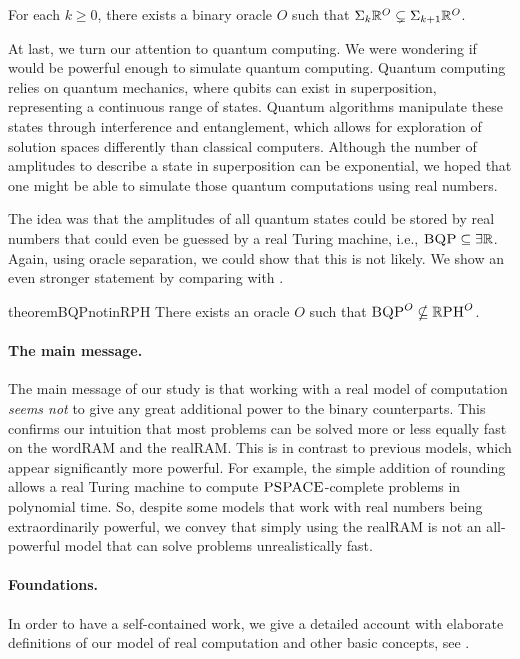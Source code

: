 \documentclass{article}
\begin{document}
    \begin{corollary}
        For each $k\geq 0$, there exists a binary oracle $O$ such that $\Sigma_{k}\mathbb{R}^O \subsetneq \Sigma_{k+1}\mathbb{R}^O$.
    \end{corollary}

    At last, we turn our attention to quantum computing.
    We were wondering if \ER would be powerful enough to simulate quantum computing.
    Quantum computing relies on quantum mechanics, where qubits can exist in superposition, representing a continuous range of states. 
    Quantum algorithms manipulate these states through interference and entanglement, which allows for exploration of solution spaces differently than classical computers. 
    Although the number of amplitudes to describe a state in superposition can be exponential,  we hoped that one might be able to simulate those 
    quantum computations using real numbers. 
    
    The idea was that the amplitudes of all quantum states could be stored by real numbers that could even be guessed by a real Turing machine, i.e., $\textsc{BQP} \subseteq \exists\mathbb{R}$.
    Again, using oracle separation, we could show that this is not likely.
    We show an even stronger statement by comparing \BQP with \RPH.

    \begin{restatable}{theorem}{BQPnotinRPH}
    \label{thm:BQPnotinRPH}
        There exists an oracle $O$ such that $\textsc{BQP}^O \nsubseteq \mathbb{R}\textsc{PH}^O$.
    \end{restatable}

    \paragraph{The main message.}
    The main message of our study is that working with a real model of computation \textit{seems not} to give any great additional power to the binary counterparts.
    This confirms our intuition that most problems can be solved more or less equally fast on the wordRAM and the realRAM.
    This is in contrast to previous models, which appear significantly more powerful.
    For example, the simple addition of rounding allows a real Turing machine to compute $\textsc{PSPACE}$-complete problems in polynomial time.
    So, despite some models that work with real numbers being extraordinarily powerful, we convey that simply using the realRAM is not an all-powerful model that can solve problems unrealistically fast.

    \paragraph{Foundations.}
    In order to have a self-contained work, we give a detailed account with elaborate definitions of our model of real computation and other basic concepts, see .
\end{document}
